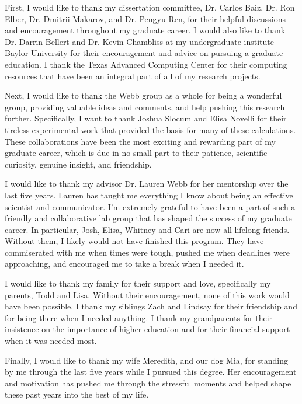 First, I would like to thank my dissertation committee, Dr. Carlos Baiz, Dr. Ron Elber, Dr. Dmitrii Makarov, and Dr. Pengyu Ren, for their helpful discussions and encouragement throughout my graduate career. 
I would also like to thank Dr. Darrin Bellert and Dr. Kevin Chambliss at my undergraduate institute Baylor University for their encouragement and advice on pursuing a graduate education. 
I thank the Texas Advanced Computing Center for their computing resources that have been an integral part of all of my research projects. 

Next, I would like to thank the Webb group as a whole for being a wonderful group, providing valuable ideas and comments, and help pushing this research further. 
Specifically, I want to thank Joshua Slocum and Elisa Novelli for their tireless experimental work that provided the basis for many of these calculations. 
These collaborations have been the most exciting and rewarding part of my graduate career, which is due in no small part to their patience, scientific curiosity, genuine insight, and friendship.  

I would like to thank my advisor Dr. Lauren Webb for her mentorship over the last five years. 
Lauren has taught me everything I know about being an effective scientist and communicator. 
I'm extremely grateful to have been a part of such a friendly and collaborative lab group that has shaped the success of my graduate career. 
In particular, Josh, Elisa, Whitney and Cari are now all lifelong friends. 
Without them, I likely would not have finished this program. 
They have commiserated with me when times were tough, pushed me when deadlines were approaching, and encouraged me to take a break when I needed it. 

I would like to thank my family for their support and love, specifically my parents, Todd and Lisa. 
Without their encouragement, none of this work would have been possible.  
I thank my siblings Zach and Lindsay for their friendship and for being there when I needed anything. 
I thank my grandparents for their insistence on the importance of higher education and for their financial support when it was needed most. 

Finally, I would like to thank my wife Meredith, and our dog Mia, for standing by me through the last five years while I pursued this degree. 
Her encouragement and motivation has pushed me through the stressful moments and helped shape these past years into the best of my life. 
